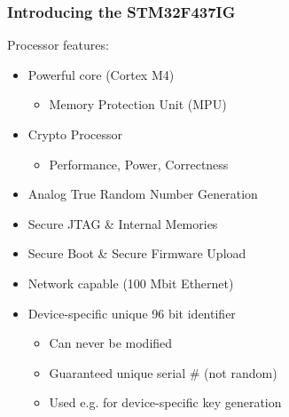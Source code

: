 \subsubsection{Introducing the STM32F437IG}
Processor features:
\begin{itemize}
  \item Powerful core (Cortex M4)
  \begin{itemize}
    \item Memory Protection Unit (MPU)
  \end{itemize}
  \item Crypto Processor
  \begin{itemize}
    \item Performance, Power, Correctness
  \end{itemize}
  \item Analog True Random Number Generation
  \item Secure JTAG \& Internal Memories
  \item Secure Boot \& Secure Firmware Upload
  \item Network capable (100 Mbit Ethernet)
  \item Device-specific unique 96 bit identifier
  \begin{itemize}
    \item Can never be modified
    \item Guaranteed unique serial \# (not random)
    \item Used e.g. for device-specific key generation
  \end{itemize}
\end{itemize}

